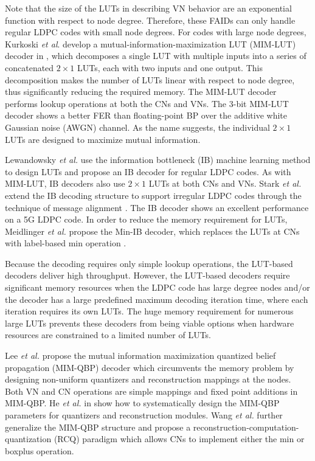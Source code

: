 \documentclass [PhD] {uclathes}
\begin{document}
Note that the size of the LUTs in \cite{Planjery2013-FAIDI,Declercq2013-FAIDII,Xiao2019-RNNFIAD,Xiao2020-RNNFAID} describing VN behavior are an exponential function with respect to node degree. Therefore, these FAIDs can only handle regular LDPC codes with small node degrees. For codes with large node degrees, Kurkoski {\em et al}. develop a mutual-information-maximization LUT (MIM-LUT) decoder in \cite{kurkoski2016-IB}, which decomposes a single LUT with multiple inputs into a series of concatenated $2\times1$ LUTs, each with two inputs and one output. This decomposition makes the number of LUTs linear with respect to node degree, thus significantly reducing the required memory.  The MIM-LUT decoder performs lookup operations at both the CNs and VNs. The 3-bit MIM-LUT decoder shows a better FER than floating-point BP over the additive white Gaussian noise (AWGN) channel. As the name suggests, the individual $2\times1$ LUTs are designed to maximize mutual information\cite{Kurkoski2014-QuanDMC}.   

Lewandowsky \emph{et al.} use the information bottleneck (IB) machine learning method to design LUTs and propose an IB decoder for regular LDPC codes. As with MIM-LUT, IB decoders also use $2\times1$ LUTs at both CNs and VNs. Stark \emph{et al.} extend the IB decoding structure to support irregular LDPC codes through the technique of message alignment \cite{Stark2018-IBMA,Stark2021-ai}. 
The IB decoder shows an excellent performance on a 5G LDPC code\cite{Stark2020-IB5G,Stark2020-IBjournal}. In order to reduce the memory requirement for LUTs, Meidlinger \emph{et al.} propose the Min-IB decoder, which replaces the LUTs at CNs with label-based min operation \cite{Meidlinger2015-MIMIB,Meidlinger2017-MINIBIRR,Meidlinger2020-MINIBIRR,Ghanaatian2018-MINIB-588}.


Because the decoding requires only simple lookup operations, the LUT-based decoders deliver high throughput. However, the LUT-based decoders require significant memory resources when the LDPC code has large degree nodes and/or the decoder has a large predefined maximum decoding iteration time, where each iteration requires its own LUTs. The huge memory requirement for numerous large LUTs prevents these decoders from being viable options when hardware resources are constrained to a limited number of LUTs.

Lee \emph{et al.}\cite{-_Lee2005-MIMQBP} propose the mutual information maximization quantized belief propagation (MIM-QBP) decoder which circumvents the memory problem by designing non-uniform quantizers and reconstruction mappings at the nodes. Both VN and CN operations are simple mappings and fixed point additions in MIM-QBP. He \emph{et al.} in \cite{He2019-MIMQBP} show how to systematically design the MIM-QBP parameters for quantizers and reconstruction modules. Wang {\em et al.} further generalize the MIM-QBP structure and propose a reconstruction-computation-quantization (RCQ) paradigm \cite{Wang2020-RCQ} which allows CNs to implement either the min or boxplus operation.
\end{document}
